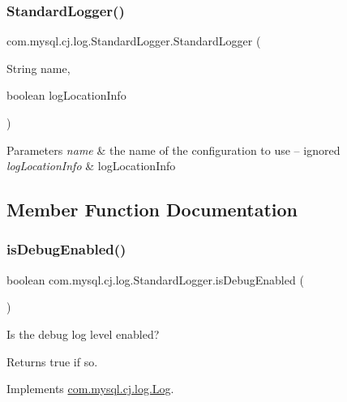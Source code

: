 \subsubsection{\texorpdfstring{Standard\+Logger()}{StandardLogger()}\hspace{0.1cm}{\footnotesize\ttfamily [2/2]}}
{\footnotesize\ttfamily com.\+mysql.\+cj.\+log.\+Standard\+Logger.\+Standard\+Logger (\begin{DoxyParamCaption}\item[{String}]{name,  }\item[{boolean}]{log\+Location\+Info }\end{DoxyParamCaption})}


\begin{DoxyParams}{Parameters}
{\em name} & the name of the configuration to use -- ignored \\
\hline
{\em log\+Location\+Info} & log\+Location\+Info \\
\hline
\end{DoxyParams}


\subsection{Member Function Documentation}
\mbox{\label{classcom_1_1mysql_1_1cj_1_1log_1_1_standard_logger_ae2a40a552ba3dec4a358cecb436341a3}} 
\subsubsection{\texorpdfstring{is\+Debug\+Enabled()}{isDebugEnabled()}}
{\footnotesize\ttfamily boolean com.\+mysql.\+cj.\+log.\+Standard\+Logger.\+is\+Debug\+Enabled (\begin{DoxyParamCaption}{ }\end{DoxyParamCaption})}

Is the \textquotesingle{}debug\textquotesingle{} log level enabled?

\begin{DoxyReturn}{Returns}
true if so. 
\end{DoxyReturn}


Implements \mbox{\hyperlink{interfacecom_1_1mysql_1_1cj_1_1log_1_1_log_a8340f13152932af117ec2f5884c06dd3}{com.\+mysql.\+cj.\+log.\+Log}}.

